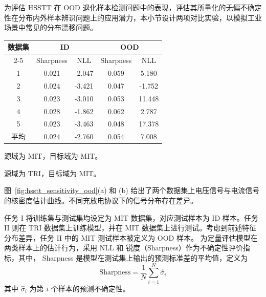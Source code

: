 为评估 HSSTT 在 OOD 退化样本检测问题中的表现，评估其所量化的无偏不确定性在分布内外样本辨识问题上的应用潜力，本小节设计两项对比实验，以模拟工业场景中常见的分布漂移问题。

\begin{table}[h]
  \centering
  \label{tab:id_ood}
  \begin{threeparttable}
    \begin{tabular}{ccccc}
    \toprule
    \multicolumn{1}{c}{数据集} & \multicolumn{2}{c}{ID \tnote{a}} & \multicolumn{2}{c}{OOD \tnote{b}} \\
    \cmidrule(lr){2-5} 
    \multicolumn{1}{c}{电池编号} & Sharpness & NLL   & Sharpness & NLL \\
    \midrule
    1     & 0.021  & -2.047 & 0.059  & 5.180    \\
    2     & 0.024  & -3.421 & 0.047  & -1.752   \\
    3     & 0.023  & -3.010 & 0.053  & 11.448 \\
    4     & 0.028  & -1.862 & 0.062  & 2.787   \\
    5     & 0.023  & -3.463  & 0.048  & 17.378\\
    \midrule
    平均  & 0.024 & -2.760 & 0.054  & 7.008  \\
    \bottomrule
    \end{tabular}
    \begin{tablenotes}
      \item[a] 源域为 MIT，目标域为 MIT。
      \item[b] 源域为 TRI，目标域为 MIT。
    \end{tablenotes}
  \end{threeparttable}
\end{table}

图~\ref{fig:hsstt_sensitivity_ood}(a) 和 (b) 给出了两个数据集上电压信号与电流信号的核密度估计曲线。不同充放电协议下的信号分布存在差异。

任务 I 将训练集与测试集均设定为 MIT 数据集，对应测试样本为 ID 样本。任务 II 则在 TRI 数据集上训练模型，并在 MIT 数据集上进行测试。考虑到前述特征分布差异，任务 II 中的 MIT 测试样本被定义为 OOD 样本。
为定量评估模型在两类样本上的估计行为，采用 NLL 和 锐度（Sharpness）作为不确定性评价指标，其中，
Sharpness 是模型在测试集上输出的预测标准差的平均值，定义为
% 
\begin{equation}
  \text{Sharpness} = \frac{1}{N}\sum_{i=1}^{N}\hat{\sigma}_{i}
\end{equation}
% 
其中 $\hat{\sigma}_{i}$ 为第 $i$ 个样本的预测不确定性。

